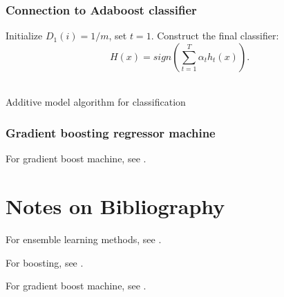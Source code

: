 \begin{refsection}
\subsubsection{Connection to Adaboost classifier}


\begin{algorithm}[H]
	\SetAlgoLined
	Initialize $D_1(i) = 1/m$, set $t = 1$.
	Construct the final classifier:
	$$H(x) = sign(\sum_{t=1}^T \alpha_t h_t(x)).$$	\\
	\caption{Additive model algorithm for classification}
\end{algorithm}


\subsubsection{Gradient boosting regressor machine}


For gradient boost machine, see \cite{friedman2001greedy}.




\section{Notes on Bibliography}
For ensemble learning methods, see \cite{seni2010ensemble}.

For boosting, see \cite{schapire2012boosting}.

For gradient boost machine, see \cite{friedman2001greedy}.

\printbibliography
\end{refsection}




